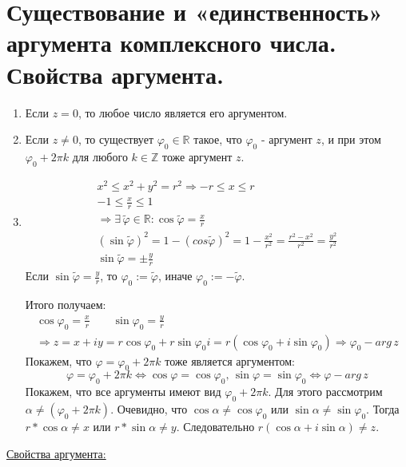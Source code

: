 \documentclass[12pt,letterpaper]{report}
\makeatletter
\theoremstyle{definition}
\renewenvironment{proof}[1][\proofname]{%
   \par\pushQED{\qed}\normalfont%
   \topsep6\p@\@plus6\p@\relax
   \trivlist\item[\hskip\labelsep\bfseries#1\@addpunct{.}]%
   \ignorespaces
}{%
   \popQED\endtrivlist\@endpefalse
}
\makeatother
\begin{document}
\section{Существование и «единственность» аргумента комплексного числа. Свойства аргумента.}
\begin{enumerate}
  \item Если $z = 0$, то любое число является его аргументом.
  \item Если $z \neq 0$, то существует $\varphi_0 \in \mathbb{R}$ такое, что $\varphi_0$ - аргумент $z$, и при этом $\varphi_0 + 2\pi k$ для любого $k \in \mathbb{Z}$ тоже аргумент $z$.
  \begin{proof} 
    \begin{gather*}
      x^2 \leqslant x^2 + y^2 = r^2 \Rightarrow -r \leqslant x \leqslant r \\
      -1 \leqslant \frac{x}{r} \leqslant 1 \\
      \Rightarrow \exists\, \widetilde{\varphi} \in \mathbb{R} : \cos\widetilde{\varphi} = \frac{x}{r} \\
      (\sin\widetilde{\varphi})^2 = 1 - (cos\widetilde{\varphi})^2 = 1 - \frac{x^2}{r^2} = \frac{r^2 - x^2}{r^2} = \frac{y^2}{r^2} \\
      \sin\widetilde{\varphi} = \pm\frac{y}{r}
    \end{gather*}
    Если $\sin\widetilde{\varphi} = \frac{y}{r}$, то $\varphi_0 := \widetilde{\varphi}$, иначе $\varphi_0 := -\widetilde{\varphi}$.

    Итого получаем:
    \begin{gather*}
      \cos\varphi_0 = \frac{x}{r} \quad\quad \sin\varphi_0 = \frac{y}{r} \\
      \Rightarrow z = x + iy = r\cos\varphi_0 + r\sin\varphi_0i = r(\cos\varphi_0 + i\sin\varphi_0) \Rightarrow \varphi_0 - arg\,z
    \end{gather*}
    Покажем, что $\varphi = \varphi_0 + 2\pi k$ тоже является аргументом:
    \[ \varphi = \varphi_0 + 2\pi k \Leftrightarrow \cos\varphi = \cos\varphi_0,\, \sin\varphi = \sin\varphi_0 \Leftrightarrow \varphi - arg\,z \]
    Покажем, что все аргументы имеют вид $\varphi_0 + 2\pi k$. Для этого рассмотрим $\alpha \neq (\varphi_0 + 2\pi k)$. 
    Очевидно, что $\cos\alpha \neq \cos\varphi_0$ или $\sin\alpha \neq \sin\varphi_0$. Тогда $r * \cos\alpha \neq x$ или $r * \sin\alpha \neq y$. 
    Следовательно $r(\cos\alpha + i\sin\alpha) \neq z$.
  \end{proof}
\end{enumerate}
\underline{Свойства аргумента:}  
\end{document}

